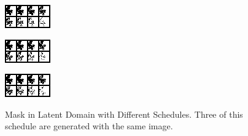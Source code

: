 \begin{figure}[H]
    \begin{minipage}[t]{0.3\textwidth}
        \centering
        \includegraphics[width=\textwidth]{images/cosine_mask_test_0.png}
        \label{fig:mask_latent_cosine}
    \end{minipage}%
    \hfill
    \begin{minipage}[t]{0.3\textwidth}
        \centering
        \includegraphics[width=\textwidth]{images/linear_mask_test_0.png}
        \label{fig:mask_latent_linear}
    \end{minipage}%
    \hfill
    \begin{minipage}[t]{0.3\textwidth}
        \centering
        \includegraphics[width=\textwidth]{images/sqrt_mask_test_0.png}
        \label{fig:mask_latent_sqrt}
    \end{minipage}
    \caption{Mask in Latent Domain with Different Schedules. Three of this schedule are generated with the same image.}
    \label{fig:mask_latent}
\end{figure}

